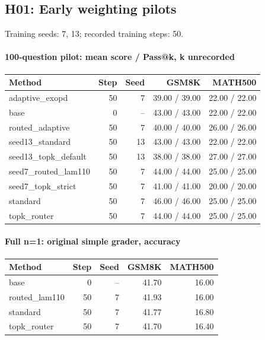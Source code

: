 \subsection{H01: Early weighting pilots}
\label{history:early_weights50}
Training seeds: 7, 13; recorded training steps: 50.
\paragraph{100-question pilot: mean score / Pass@k, k unrecorded}
{\footnotesize\setlength{\tabcolsep}{3.5pt}
\begin{longtable}{@{}p{1.4in}rrrr@{}}
\toprule
Method & Step & Seed & GSM8K & MATH500 \\
\midrule\endhead
adaptive\_\allowbreak{}exopd & 50 & 7 & 39.00 / 39.00 & 22.00 / 22.00 \\
base & 0 & -- & 43.00 / 43.00 & 22.00 / 22.00 \\
routed\_\allowbreak{}adaptive & 50 & 7 & 40.00 / 40.00 & 26.00 / 26.00 \\
seed13\_\allowbreak{}standard & 50 & 13 & 43.00 / 43.00 & 22.00 / 22.00 \\
seed13\_\allowbreak{}topk\_\allowbreak{}default & 50 & 13 & 38.00 / 38.00 & 27.00 / 27.00 \\
seed7\_\allowbreak{}routed\_\allowbreak{}lam110 & 50 & 7 & 44.00 / 44.00 & 25.00 / 25.00 \\
seed7\_\allowbreak{}topk\_\allowbreak{}strict & 50 & 7 & 41.00 / 41.00 & 20.00 / 20.00 \\
standard & 50 & 7 & 46.00 / 46.00 & 25.00 / 25.00 \\
topk\_\allowbreak{}router & 50 & 7 & 44.00 / 44.00 & 25.00 / 25.00 \\
\bottomrule\end{longtable}
}
\paragraph{Full n=1: original simple grader, accuracy}
{\footnotesize\setlength{\tabcolsep}{3.5pt}
\begin{longtable}{@{}p{1.4in}rrrr@{}}
\toprule
Method & Step & Seed & GSM8K & MATH500 \\
\midrule\endhead
base & 0 & -- & 41.70 & 16.00 \\
routed\_\allowbreak{}lam110 & 50 & 7 & 41.93 & 16.00 \\
standard & 50 & 7 & 41.77 & 16.80 \\
topk\_\allowbreak{}router & 50 & 7 & 41.70 & 16.40 \\
\bottomrule\end{longtable}
}
